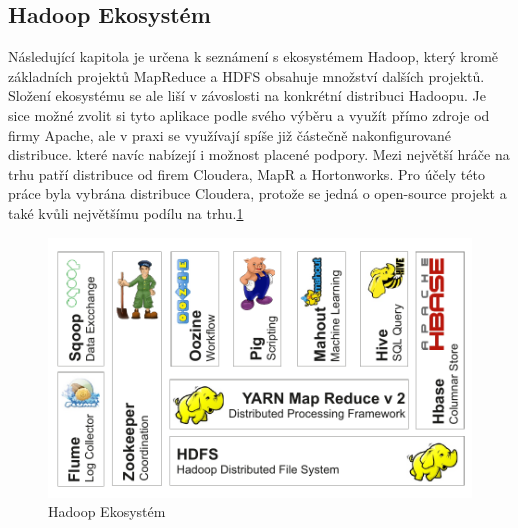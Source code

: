 \documentclass[thesis=M,czech]{FITthesis}[2012/06/26]
\begin{document}
\subsection{Hadoop Ekosystém}
Následující kapitola je určena k seznámení s ekosystémem Hadoop, který kromě základních projektů MapReduce a HDFS obsahuje množství dalších projektů. Složení ekosystému se ale liší v závoslosti na konkrétní distribuci Hadoopu. Je sice možné zvolit si tyto aplikace podle svého výběru a využít přímo zdroje od firmy Apache, ale  v praxi se využívají spíše již částečně nakonfigurované distribuce. které navíc nabízejí i možnost placené podpory. Mezi největší hráče na trhu patří distribuce od firem Cloudera, MapR a Hortonworks.\cite{CLOUDERA} Pro účely této práce byla vybrána distribuce Cloudera, protože se jedná o open-source projekt a také kvůli největšímu podílu na trhu.\ref{fig:eko}  

\begin{figure}\centering
	\includegraphics[width=1\textwidth, angle=0]{files/HadoopEco}
	\caption[Hadoop Ekosystém]{Hadoop Ekosystém}\label{fig:eko}
\end{figure}
\end{document}

